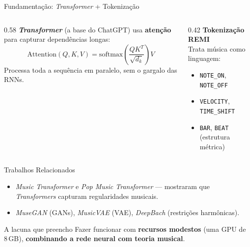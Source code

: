 \documentclass[aspectratio=169]{beamer}
\begin{document}
\begin{frame}{Fundamentação: \emph{Transformer} + Tokenização}
  \begin{columns}[T]
    \begin{column}{0.58\textwidth}
      \textbf{\emph{Transformer}} (a base do ChatGPT) usa \textbf{atenção} para
      capturar dependências longas:
      \[
        \mathrm{Attention}(Q,K,V)=\mathrm{softmax}\!\left(\frac{QK^{T}}{\sqrt{d_k}}\right)V
      \]
      \footnotesize Processa toda a sequência em paralelo, sem o gargalo das RNNs.
    \end{column}
    \begin{column}{0.42\textwidth}
      \textbf{Tokenização REMI}\\
      Trata música como linguagem:
      \begin{itemize}\footnotesize
        \item \texttt{NOTE\_ON}, \texttt{NOTE\_OFF}
        \item \texttt{VELOCITY}, \texttt{TIME\_SHIFT}
        \item \texttt{BAR}, \texttt{BEAT} (estrutura métrica)
      \end{itemize}
    \end{column}
  \end{columns}
\end{frame}

\begin{frame}{Trabalhos Relacionados}
  \begin{itemize}
    \item \emph{Music Transformer} e \emph{Pop Music Transformer} --- mostraram que
      \emph{Transformers} capturam regularidades musicais.
    \item \emph{MuseGAN} (GANs), \emph{MusicVAE} (VAE), \emph{DeepBach} (restrições
      harmônicas).
  \end{itemize}
  \vspace{0.8em}
  \begin{block}{A lacuna que preencho}
    Fazer funcionar com \textbf{recursos modestos} (uma GPU de 8\,GB),
    \textbf{combinando a rede neural com teoria musical}.
  \end{block}
\end{frame}
\end{document}
